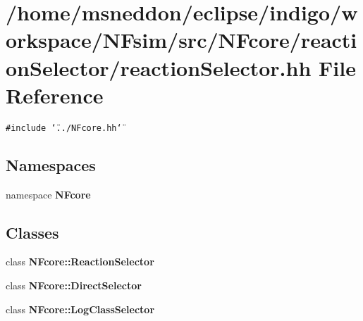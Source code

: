 \section{/home/msneddon/eclipse/indigo/workspace/NFsim/src/NFcore/reactionSelector/reactionSelector.hh File Reference}
\label{reactionSelector_8hh}


{\tt \#include \char`\"{}../NFcore.hh\char`\"{}}\par
\subsection*{Namespaces}
\begin{CompactItemize}
\item 
namespace {\bf NFcore}
\end{CompactItemize}
\subsection*{Classes}
\begin{CompactItemize}
\item 
class {\bf NFcore::ReactionSelector}
\item 
class {\bf NFcore::DirectSelector}
\item 
class {\bf NFcore::LogClassSelector}
\end{CompactItemize}
